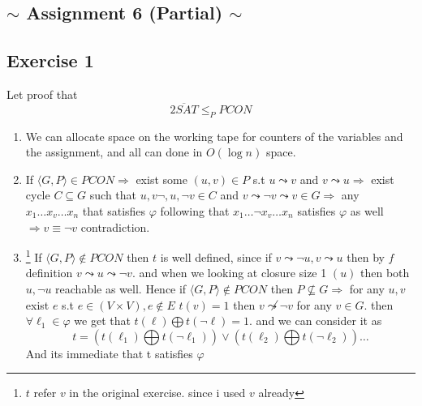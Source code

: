 \documentclass[12pt]{article}
\begin{document}
\begin{center}

\section{$\sim$ Assignment 6 (Partial) $\sim$}
\end{center}

\subsection{ Exercise 1}
Let proof that 
\[\overline{2SAT}\le_PPCON
\]
\begin{enumerate}[label=(\alph*)]
\item We can allocate space on the working tape for counters of the variables and the assignment, and all can done in $O(\log n)$ space.
\item If $\langle G,P \rangle \in PCON \Rightarrow $ exist some $(u,v)\in P$ s.t $u \leadsto v$ and  $v \leadsto u \Rightarrow$ exist cycle $C \subseteq G$ such that $u,v\neg ,u,\neg v\in C$ and $v \leadsto \neg v \leadsto  v\in G \Rightarrow $  any  $x_1\dots x_v \dots x_n$ that satisfies $\varphi $ following that  $x_1\dots \neg x_v \dots x_n $ satisfies $\varphi$ as well  $\Rightarrow v\equiv \neg v $ contradiction.
\item\footnote{$t$ refer $v$ in the original exercise. since i used $v$ already } If  $\langle G,P \rangle \notin PCON$ then $t$ is well
defined, since if $ v \leadsto \neg u ,v \leadsto u $ then by  $f$ definition  $v \leadsto  u\leadsto \neg v$. and when we looking at closure size 1 $(u)$ then both $u,\neg u$  reachable as well. Hence if  $\langle G,P \rangle \notin PCON$ then $P \not\subseteq G \Rightarrow$ for any $u,v$ exist $e$ s.t $e\in (V\times V) ,e \notin E$  $t(v)=1$ then $v \not\leadsto \neg v$ for any $v\in G$. then  $\forall \ell_1 \in \varphi $ we get that $t(\ell)\bigoplus t(\neg\ell)=1$. and we can consider it as 
\[ 
t=\left(t(\ell_1)\bigoplus t(\neg\ell_1)\right)\vee \left(t(\ell_2)\bigoplus t(\neg\ell_2)\right) \dots
\]And its immediate  that t satisfies $\varphi$ 
\end{enumerate}
\end{document}
